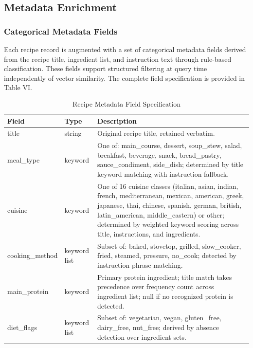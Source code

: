 \documentclass[conference]{IEEEtran}
\begin{document}
\subsection{Metadata Enrichment}
\subsubsection{Categorical Metadata Fields}
Each recipe record is augmented with a set of categorical metadata fields derived from the recipe title, ingredient list, and instruction text through rule-based classification. These fields support structured filtering at query time independently of vector similarity. The complete field specification is provided in Table VI.

\begin{table}[!t]
\caption{Recipe Metadata Field Specification}
\label{tab:recipe_metadata}
\centering
\footnotesize
\begin{tabular}{p{3.5cm} p{1.8cm} p{10.5cm}}
\toprule
\textbf{Field} & \textbf{Type} & \textbf{Description} \\
\midrule

title & string &
Original recipe title, retained verbatim. \\

meal\_type & keyword &
One of: main\_course, dessert, soup\_stew, salad, breakfast, beverage,
snack, bread\_pastry, sauce\_condiment, side\_dish; determined by title
keyword matching with instruction fallback. \\

cuisine & keyword &
One of 16 cuisine classes (italian, asian, indian, french,
mediterranean, mexican, american, greek, japanese, thai, chinese,
spanish, german, british, latin\_american, middle\_eastern) or other;
determined by weighted keyword scoring across title, instructions, and
ingredients. \\

cooking\_method & keyword list &
Subset of: baked, stovetop, grilled, slow\_cooker, fried, steamed,
pressure, no\_cook; detected by instruction phrase matching. \\

main\_protein & keyword &
Primary protein ingredient; title match takes precedence over frequency
count across ingredient list; null if no recognized protein is detected. \\

diet\_flags & keyword list &
Subset of: vegetarian, vegan, gluten\_free, dairy\_free, nut\_free;
derived by absence detection over ingredient sets. \\


\end{tabular}
\end{table}
\end{document}
